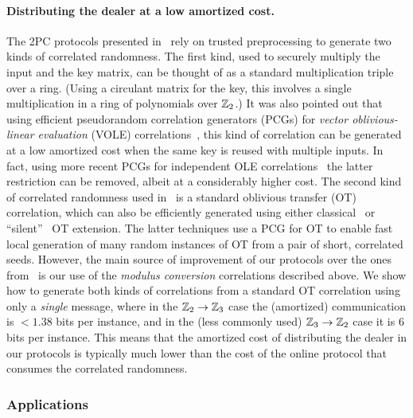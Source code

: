 \paragraph{Distributing the dealer at a low amortized cost.} The 2PC protocols presented in~\cite{boneh2018-darkmatter} rely on trusted preprocessing to generate two kinds of correlated randomness. The first kind, used to securely multiply the input and the key matrix, can be thought of as a standard multiplication triple over a ring. (Using a circulant matrix for the key, this involves a single multiplication in a ring of polynomials over $\mathbb{Z}_2$.)  It was also pointed out that using efficient pseudorandom correlation generators (PCGs) for {\em vector oblivious-linear evaluation} (VOLE) correlations~\cite{BCGI18,BCGIKRS19,SchoppmannGR019}, this kind of correlation can be generated at a low amortized cost when the same key is reused with multiple inputs. In fact, using more recent PCGs for independent OLE correlations~\cite{boyle2020-lpn-pcg} the latter restriction can be removed, albeit at a considerably higher cost.  The second kind of correlated randomness used in~\cite{boneh2018-darkmatter} is a standard oblivious transfer (OT) correlation, which can also be efficiently generated using either classical~\cite{IKNP} or ``silent''~\cite{BCGIKRS19,yang2020-ferret} OT extension. The latter techniques use a PCG for OT to enable fast local generation of many random instances of OT from a pair of short, correlated seeds.  
However, the main source of improvement of our protocols over the ones from~\cite{boneh2018-darkmatter}  is our use of the {\em modulus conversion} correlations described above. We show how to generate both kinds of correlations from a standard OT correlation using only a {\em single} message, where in the $\mathbb{Z}_2 \to \mathbb{Z}_3$ case the (amortized) communication is $<1.38$ bits per instance, and in the (less commonly used) $\mathbb{Z}_3 \to \mathbb{Z}_2$ case it is $6$ bits per instance. This means that the amortized cost of distributing the dealer in our protocols is typically much lower than the cost of the online protocol that consumes the correlated randomness.


\subsubsection{Applications}


